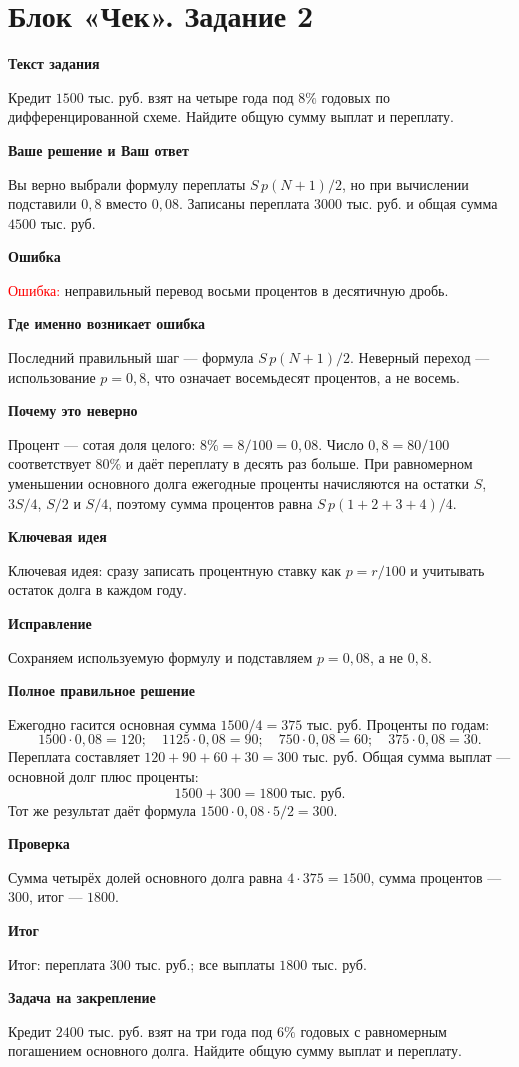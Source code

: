 \documentclass[11pt,a4paper]{article}
\newcommand{\Part}[1]{\par\medskip\noindent\textbf{#1}\par\smallskip}
\newcommand{\Task}[2]{\clearpage\phantomsection\label{task:#1}\section*{#2}}
\newcommand{\Err}[1]{\textcolor{red}{Ошибка:} #1}
\newcommand{\Idea}[1]{\textcolor{blue!60!black}{Ключевая идея:} #1}
\newcommand{\Result}[1]{\textcolor{teal!60!black}{Итог:} #1}
\begin{document}
\Task{c2}{Блок «Чек». Задание 2}
\Part{Текст задания}
Кредит $1500$ тыс. руб. взят на четыре года под $8\%$ годовых по дифференцированной схеме. Найдите общую сумму выплат и переплату.
\Part{Ваше решение и Ваш ответ}
Вы верно выбрали формулу переплаты $S\,p(N+1)/2$, но при вычислении подставили $0{,}8$ вместо $0{,}08$. Записаны переплата $3000$ тыс. руб. и общая сумма $4500$ тыс. руб.
\Part{Ошибка}
\Err{неправильный перевод восьми процентов в десятичную дробь.}
\Part{Где именно возникает ошибка}
Последний правильный шаг --- формула $S\,p(N+1)/2$. Неверный переход --- использование $p=0{,}8$, что означает восемьдесят процентов, а не восемь.
\Part{Почему это неверно}
Процент --- сотая доля целого: $8\%=8/100=0{,}08$. Число $0{,}8=80/100$ соответствует $80\%$ и даёт переплату в десять раз больше. При равномерном уменьшении основного долга ежегодные проценты начисляются на остатки $S$, $3S/4$, $S/2$ и $S/4$, поэтому сумма процентов равна $S\,p(1+2+3+4)/4$.
\Part{Ключевая идея}
\Idea{сразу записать процентную ставку как $p=r/100$ и учитывать остаток долга в каждом году.}
\Part{Исправление}
Сохраняем используемую формулу и подставляем $p=0{,}08$, а не $0{,}8$.
\Part{Полное правильное решение}
Ежегодно гасится основная сумма $1500/4=375$ тыс. руб. Проценты по годам:
\[1500\cdot0{,}08=120;\quad1125\cdot0{,}08=90;\quad750\cdot0{,}08=60;\quad375\cdot0{,}08=30.\]
Переплата составляет $120+90+60+30=300$ тыс. руб. Общая сумма выплат --- основной долг плюс проценты:
\[1500+300=1800\ \text{тыс. руб.}\]
Тот же результат даёт формула $1500\cdot0{,}08\cdot5/2=300$.
\Part{Проверка}
Сумма четырёх долей основного долга равна $4\cdot375=1500$, сумма процентов --- $300$, итог --- $1800$.
\Part{Итог}
\Result{переплата $300$ тыс. руб.; все выплаты $1800$ тыс. руб.}
\Part{Задача на закрепление}
Кредит $2400$ тыс. руб. взят на три года под $6\%$ годовых с равномерным погашением основного долга. Найдите общую сумму выплат и переплату.
\end{document}
